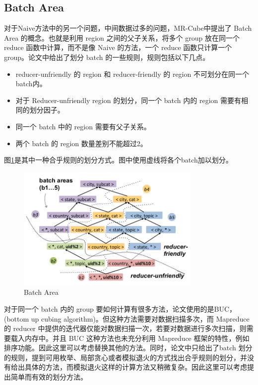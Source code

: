 \subsection{Batch Area}

对于Naive方法中的另一个问题，中间数据过多的问题，MR-Cube中提出了 Batch Area 的概念。也就是利用 region 之间的父子关系，将多个 group 放在同一个 reduce 函数中计算，而不是像 Naive 的方法，一个 reduce 函数只计算一个 group。论文中给出了划分 batch 的一些规则，规则包括以下几点。
\begin{itemize}\setlength{\itemsep}{0pt}
\item reducer-unfriendly 的 region 和 reducer-friendly 的 region 不可划分在同一个batch内。
\item 对于 Reducer-unfriendly region 的划分，同一个 batch 内的 region 需要有相同的划分因子。
\item 同一个 batch 中的 region 需要有父子关系。
\item 两个 batch 的 region 数量差别不能超过2。
\end{itemize}

图\ref{batch_area}是其中一种合乎规则的划分方式。图中使用虚线将各个batch加以划分。

\begin{figure}[!ht] 
\centering\includegraphics[width=3.5in]{picture/ch_datacube_mr/batch_area} 
\caption{Batch Area}\label{batch_area} 
\end{figure}

对于同一个 batch 内的 group 要如何计算有很多方法，论文使用的是BUC，(bottom up cubing algorithm)。但这种方法需要对数据扫描多次，而 Mapreduce 的 reducer 中提供的迭代器仅能对数据扫描一次，若要对数据进行多次扫描，则需要载入内存中。并且 BUC 这种方法也未充分利用 Mapreduce 框架的特性，例如排序功能。因此这里可以考虑替换其他的方法。同时，论文中只给出了batch 划分的规则，提到可用枚举、局部贪心或者模拟退火的方式找出合乎规则的划分，并没有给出具体的方法，而模拟退火这样的计算方法又稍微复杂。因此这里可以考虑提出简单而有效的划分方法。


